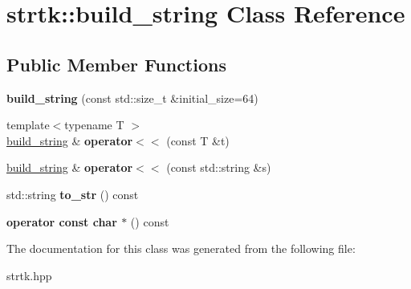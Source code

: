 \hypertarget{classstrtk_1_1build__string}{\section{strtk\-:\-:build\-\_\-string Class Reference}
\label{classstrtk_1_1build__string}
}
\subsection*{Public Member Functions}
\begin{DoxyCompactItemize}
\item 
\hypertarget{classstrtk_1_1build__string_a5f1f80fafd748936825a27492e94f55f}{{\bfseries build\-\_\-string} (const std\-::size\-\_\-t \&initial\-\_\-size=64)}\label{classstrtk_1_1build__string_a5f1f80fafd748936825a27492e94f55f}

\item 
\hypertarget{classstrtk_1_1build__string_af31865bd8fd0f0aaabccda8f635b9bb4}{{\footnotesize template$<$typename T $>$ }\\\hyperlink{classstrtk_1_1build__string}{build\-\_\-string} \& {\bfseries operator$<$$<$} (const T \&t)}\label{classstrtk_1_1build__string_af31865bd8fd0f0aaabccda8f635b9bb4}

\item 
\hypertarget{classstrtk_1_1build__string_a5ba3f5b17075185defc635557f44fb5c}{\hyperlink{classstrtk_1_1build__string}{build\-\_\-string} \& {\bfseries operator$<$$<$} (const std\-::string \&s)}\label{classstrtk_1_1build__string_a5ba3f5b17075185defc635557f44fb5c}

\item 
\hypertarget{classstrtk_1_1build__string_a7d77ad6475464e446e010c6b1d047da7}{std\-::string {\bfseries to\-\_\-str} () const }\label{classstrtk_1_1build__string_a7d77ad6475464e446e010c6b1d047da7}

\item 
\hypertarget{classstrtk_1_1build__string_a0425f834a21ae30d73f005f6dae86d05}{{\bfseries operator const char $\ast$} () const }\label{classstrtk_1_1build__string_a0425f834a21ae30d73f005f6dae86d05}

\end{DoxyCompactItemize}


The documentation for this class was generated from the following file\-:\begin{DoxyCompactItemize}
\item 
strtk.\-hpp\end{DoxyCompactItemize}
